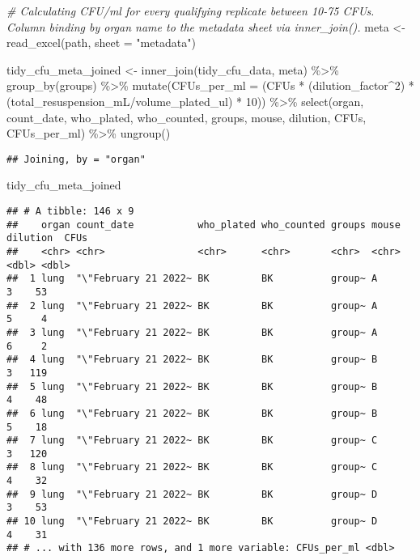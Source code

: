 \documentclass[
]{book}
\newenvironment{Shaded}{\begin{snugshade}}{\end{snugshade}}
\newcommand{\AttributeTok}[1]{\textcolor[rgb]{0.77,0.63,0.00}{#1}}
\newcommand{\CommentTok}[1]{\textcolor[rgb]{0.56,0.35,0.01}{\textit{#1}}}
\newcommand{\DecValTok}[1]{\textcolor[rgb]{0.00,0.00,0.81}{#1}}
\newcommand{\FunctionTok}[1]{\textcolor[rgb]{0.00,0.00,0.00}{#1}}
\newcommand{\NormalTok}[1]{#1}
\newcommand{\OtherTok}[1]{\textcolor[rgb]{0.56,0.35,0.01}{#1}}
\newcommand{\SpecialCharTok}[1]{\textcolor[rgb]{0.00,0.00,0.00}{#1}}
\newcommand{\StringTok}[1]{\textcolor[rgb]{0.31,0.60,0.02}{#1}}
\begin{document}
\begin{Shaded}
\begin{Highlighting}[]
\CommentTok{\# Calculating CFU/ml for every qualifying replicate between 10{-}75 CFUs. Column binding by organ name to the metadata sheet via inner\_join().}
\NormalTok{meta }\OtherTok{\textless{}{-}} \FunctionTok{read\_excel}\NormalTok{(path, }\AttributeTok{sheet =} \StringTok{"metadata"}\NormalTok{)}

\NormalTok{tidy\_cfu\_meta\_joined }\OtherTok{\textless{}{-}} \FunctionTok{inner\_join}\NormalTok{(tidy\_cfu\_data, meta) }\SpecialCharTok{\%\textgreater{}\%}
  \FunctionTok{group\_by}\NormalTok{(groups) }\SpecialCharTok{\%\textgreater{}\%} 
  \FunctionTok{mutate}\NormalTok{(}\AttributeTok{CFUs\_per\_ml =}\NormalTok{ (CFUs }\SpecialCharTok{*}\NormalTok{ (dilution\_factor}\SpecialCharTok{\^{}}\DecValTok{2}\NormalTok{) }\SpecialCharTok{*}\NormalTok{ (total\_resuspension\_mL}\SpecialCharTok{/}\NormalTok{volume\_plated\_ul) }\SpecialCharTok{*} \DecValTok{10}\NormalTok{)) }\SpecialCharTok{\%\textgreater{}\%}
  \FunctionTok{select}\NormalTok{(organ, count\_date, who\_plated, who\_counted, groups,  mouse, dilution,  CFUs, CFUs\_per\_ml) }\SpecialCharTok{\%\textgreater{}\%}
  \FunctionTok{ungroup}\NormalTok{()}
\end{Highlighting}
\end{Shaded}

\begin{verbatim}
## Joining, by = "organ"
\end{verbatim}

\begin{Shaded}
\begin{Highlighting}[]
\NormalTok{tidy\_cfu\_meta\_joined}
\end{Highlighting}
\end{Shaded}

\begin{verbatim}
## # A tibble: 146 x 9
##    organ count_date           who_plated who_counted groups mouse dilution  CFUs
##    <chr> <chr>                <chr>      <chr>       <chr>  <chr>    <dbl> <dbl>
##  1 lung  "\"February 21 2022~ BK         BK          group~ A            3    53
##  2 lung  "\"February 21 2022~ BK         BK          group~ A            5     4
##  3 lung  "\"February 21 2022~ BK         BK          group~ A            6     2
##  4 lung  "\"February 21 2022~ BK         BK          group~ B            3   119
##  5 lung  "\"February 21 2022~ BK         BK          group~ B            4    48
##  6 lung  "\"February 21 2022~ BK         BK          group~ B            5    18
##  7 lung  "\"February 21 2022~ BK         BK          group~ C            3   120
##  8 lung  "\"February 21 2022~ BK         BK          group~ C            4    32
##  9 lung  "\"February 21 2022~ BK         BK          group~ D            3    53
## 10 lung  "\"February 21 2022~ BK         BK          group~ D            4    31
## # ... with 136 more rows, and 1 more variable: CFUs_per_ml <dbl>
\end{verbatim}
\end{document}
